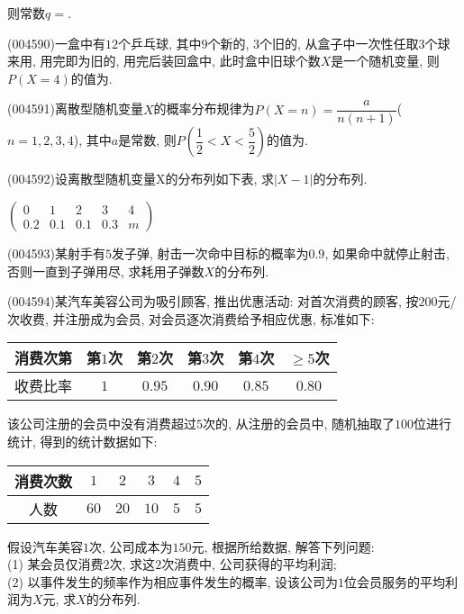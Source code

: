 则常数$q=$.
\item (004590)一盒中有$12$个乒乓球, 其中$9$个新的, $3$个旧的, 从盒子中一次性任取$3$个球来用, 用完即为旧的, 用完后装回盒中, 此时盒中旧球个数$X$是一个随机变量, 则$P(X=4)$的值为.
\item (004591)离散型随机变量$X$的概率分布规律为$P(X=n)=\dfrac{a}{n(n+1)}$($n=1, 2, 3, 4$), 其中$a$是常数, 则$P(\dfrac 12<X<\dfrac 52)$的值为.
\item (004592)设离散型随机变量X的分布列如下表, 求$|X-1|$的分布列.
\begin{center}
    $\begin{pmatrix}
        0 & 1 & 2 & 3 & 4 \\ 
        0.2 & 0.1 & 0.1 & 0.3 & m 
    \end{pmatrix}$
\end{center}
\item (004593)某射手有$5$发子弹, 射击一次命中目标的概率为$0.9$, 如果命中就停止射击, 否则一直到子弹用尽, 求耗用子弹数$X$的分布列.
\item (004594)某汽车美容公司为吸引顾客, 推出优惠活动: 对首次消费的顾客, 按$200$元/次收费, 并注册成为会员, 对会员逐次消费给予相应优惠, 标准如下:\\
\begin{center}
    \begin{tabular}{|c|c|c|c|c|c|}
        \hline
        消费次第 & 第$1$次 & 第$2$次 & 第$3$次 & 第$4$次 & $\ge 5$次 \\ \hline
        收费比率 & $1$ & $0.95$ & $0.90$ & $0.85$ & $0.80$\\ \hline
    \end{tabular}
\end{center}
该公司注册的会员中没有消费超过$5$次的, 从注册的会员中, 随机抽取了$100$位进行统计, 得到的统计数据如下:
\begin{center}
    \begin{tabular}{|c|c|c|c|c|c|}
        \hline
        消费次数 & $1$ & $2$ & $3$ & $4$ & $5$ \\ \hline
        人数 & $60$ & $20$ & $10$ & $5$ & $5$\\ \hline
    \end{tabular}
\end{center}
假设汽车美容$1$次, 公司成本为$150$元, 根据所给数据, 解答下列问题:\\
(1) 某会员仅消费$2$次, 求这$2$次消费中, 公司获得的平均利润;\\
(2) 以事件发生的频率作为相应事件发生的概率, 设该公司为$1$位会员服务的平均利润为$X$元, 求$X$的分布列.
